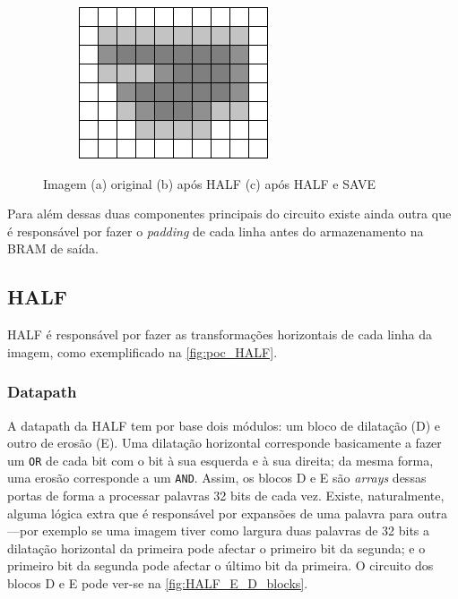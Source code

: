 \documentclass[a4paper]{article}
\begin{document}
\begin{figure}[h]
\begin{subfigure}[b]{0.32\textwidth}
		\includegraphics[width=\linewidth]{poc_SAVE}
		\caption{}
		\label{fig:poc_SAVE}
	\end{subfigure}
	\caption{Imagem (a) original (b) após HALF (c) após HALF e SAVE}
	\label{fig:poc}
\end{figure}

Para além dessas duas componentes principais do circuito existe ainda outra que é responsável por fazer o \textit{padding} de cada linha antes do armazenamento na BRAM de saída.

\subsection{HALF}
HALF é responsável por fazer as transformações horizontais de cada linha da imagem, como exemplificado na \autoref{fig:poc_HALF}.

\subsubsection{Datapath}
A datapath da HALF tem por base dois módulos: um bloco de dilatação (D) e outro de erosão (E). Uma dilatação horizontal corresponde basicamente a fazer um \texttt{OR} de cada bit com o bit à sua esquerda e à sua direita; da mesma forma, uma erosão corresponde a um \texttt{AND}. Assim, os blocos D e E são \textit{arrays} dessas portas de forma a processar palavras 32 bits de cada vez. Existe, naturalmente, alguma lógica extra que é responsável por expansões de uma palavra para outra---por exemplo se uma imagem tiver como largura duas palavras de 32 bits a dilatação horizontal da primeira pode afectar o primeiro bit da segunda; e o primeiro bit da segunda pode afectar o último bit da primeira. O circuito dos blocos D e E pode ver-se na \autoref{fig:HALF_E_D_blocks}.
\end{document}
